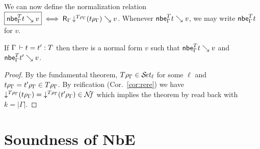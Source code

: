 \documentclass[acmlarge,review,anonymous]{acmart}\settopmatter{printfolios=true}
\begin{document}
We can now define the normalization relation
$\fbox{$\nbe \Gamma T t \evalsto v$} \iff \R {\Gamma} {\down{T \rho_\Gamma} (t \rho_\Gamma)} v$.
Whenever $\nbe \Gamma T t \evalsto v$, we may write $\nbe \Gamma T t$ for $v$.

\begin{theorem}
  If\/ $\Gamma \der t = t' : T$ then there is a normal form $v$ such that
  $\nbe \Gamma T t \evalsto v$ and $\nbe \Gamma T {t'} \evalsto v$.
\end{theorem}
\begin{proof}
  By the fundamental theorem, $T \rho_\Gamma \in \SET[\ell]$ for some $\ell$ and
  $t \rhog = t' \rhog \in T\rhog$.  By reification (Cor.~\ref{cor:rere}) we have
  $\down{T\rhog} (t\rhog) = \down{T\rhog}(t'\rhog) \in \NF$ which implies the theorem
  by read back with $k = |\Gamma|$.
\end{proof}



\section{Soundness  of NbE}
\label{sec:compl}
\end{document}
